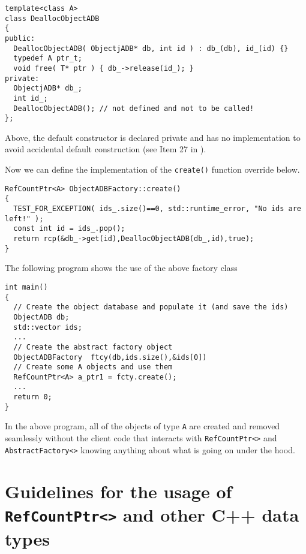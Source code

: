 {\scriptsize\begin{verbatim}
template<class A>
class DeallocObjectADB
{
public:
  DeallocObjectADB( ObjectjADB* db, int id ) : db_(db), id_(id) {}
  typedef A ptr_t;
  void free( T* ptr ) { db_->release(id_); }
private:
  ObjectjADB* db_;
  int id_;
  DeallocObjectADB(); // not defined and not to be called!
};
\end{verbatim}}

{}\noindent{}Above, the default constructor is declared private and
has no implementation to avoid accidental default construction (see
Item 27 in {}\cite{ref:meyers_1994}).

Now we can define the implementation of the {}\texttt{create()} function
override below.

{\scriptsize\begin{verbatim}
RefCountPtr<A> ObjectADBFactory::create()
{
  TEST_FOR_EXCEPTION( ids_.size()==0, std::runtime_error, "No ids are left!" );
  const int id = ids_.pop();
  return rcp(&db_->get(id),DeallocObjectADB(db_,id),true);
}
\end{verbatim}}

The following program shows the use of the above factory class

{\scriptsize\begin{verbatim}
int main()
{
  // Create the object database and populate it (and save the ids)
  ObjectADB db;
  std::vector ids;
  ...
  // Create the abstract factory object
  ObjectADBFactory  ftcy(db,ids.size(),&ids[0])
  // Create some A objects and use them
  RefCountPtr<A> a_ptr1 = fcty.create();
  ...
  return 0;
}
\end{verbatim}}

In the above program, all of the objects of type {}\texttt{A} are
created and removed seamlessly without the client code that interacts
with {}\texttt{Ref\-Count\-Ptr<>} and {}\texttt{AbstractFactory<>}
knowing anything about what is going on under the hood.

%
\section{Guidelines for the usage of {}\texttt{Ref\-Count\-Ptr<>} and other C++ data types}
%

